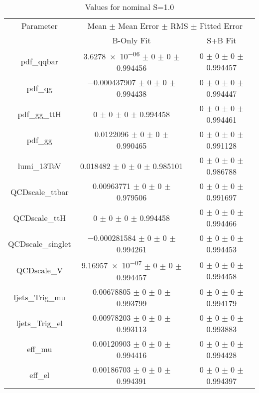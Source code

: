 \begin{table}
\centering
\caption{Values for nominal S=1.0}
\begin{tabular}{ccc}
\toprule
Parameter 	& \multicolumn{2}{c}{Mean $\pm$ Mean Error $\pm$ RMS $\pm$ Fitted Error}\\
 	& B-Only Fit & S+B Fit\\
\midrule
pdf\_qqbar 	& \num{3.6278e-06} $\pm$ \num{0} $\pm$ \num{0} $\pm$ \num{0.994456} 	& \num{0} $\pm$ \num{0} $\pm$ \num{0} $\pm$ \num{0.994457}\\
pdf\_qg 	& \num{-0.000437907} $\pm$ \num{0} $\pm$ \num{0} $\pm$ \num{0.994438} 	& \num{0} $\pm$ \num{0} $\pm$ \num{0} $\pm$ \num{0.994447}\\
pdf\_gg\_ttH 	& \num{0} $\pm$ \num{0} $\pm$ \num{0} $\pm$ \num{0.994458} 	& \num{0} $\pm$ \num{0} $\pm$ \num{0} $\pm$ \num{0.994461}\\
pdf\_gg 	& \num{0.0122096} $\pm$ \num{0} $\pm$ \num{0} $\pm$ \num{0.990465} 	& \num{0} $\pm$ \num{0} $\pm$ \num{0} $\pm$ \num{0.991128}\\
lumi\_13TeV 	& \num{0.018482} $\pm$ \num{0} $\pm$ \num{0} $\pm$ \num{0.985101} 	& \num{0} $\pm$ \num{0} $\pm$ \num{0} $\pm$ \num{0.986788}\\
QCDscale\_ttbar 	& \num{0.00963771} $\pm$ \num{0} $\pm$ \num{0} $\pm$ \num{0.979506} 	& \num{0} $\pm$ \num{0} $\pm$ \num{0} $\pm$ \num{0.991697}\\
QCDscale\_ttH 	& \num{0} $\pm$ \num{0} $\pm$ \num{0} $\pm$ \num{0.994458} 	& \num{0} $\pm$ \num{0} $\pm$ \num{0} $\pm$ \num{0.994466}\\
QCDscale\_singlet 	& \num{-0.000281584} $\pm$ \num{0} $\pm$ \num{0} $\pm$ \num{0.994261} 	& \num{0} $\pm$ \num{0} $\pm$ \num{0} $\pm$ \num{0.994453}\\
QCDscale\_V 	& \num{9.16957e-07} $\pm$ \num{0} $\pm$ \num{0} $\pm$ \num{0.994457} 	& \num{0} $\pm$ \num{0} $\pm$ \num{0} $\pm$ \num{0.994458}\\
ljets\_Trig\_mu 	& \num{0.00678805} $\pm$ \num{0} $\pm$ \num{0} $\pm$ \num{0.993799} 	& \num{0} $\pm$ \num{0} $\pm$ \num{0} $\pm$ \num{0.994179}\\
ljets\_Trig\_el 	& \num{0.00978203} $\pm$ \num{0} $\pm$ \num{0} $\pm$ \num{0.993113} 	& \num{0} $\pm$ \num{0} $\pm$ \num{0} $\pm$ \num{0.993883}\\
eff\_mu 	& \num{0.00120903} $\pm$ \num{0} $\pm$ \num{0} $\pm$ \num{0.994416} 	& \num{0} $\pm$ \num{0} $\pm$ \num{0} $\pm$ \num{0.994428}\\
eff\_el 	& \num{0.00186703} $\pm$ \num{0} $\pm$ \num{0} $\pm$ \num{0.994391} 	& \num{0} $\pm$ \num{0} $\pm$ \num{0} $\pm$ \num{0.994397}\\

\end{tabular}
\end{table}

